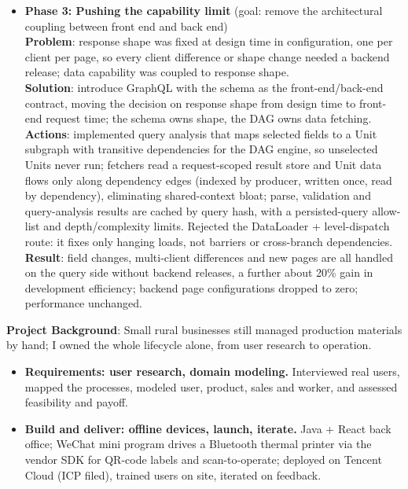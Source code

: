 \documentclass{resume}
\begin{document}
\begin{itemize}
    \textbf{Result}: core interface P99 down 30-40\% on average.
    \item \textbf{Phase 3: Pushing the capability limit} (goal: remove the architectural coupling between front end and back end)\\
    \textbf{Problem}: response shape was fixed at design time in configuration, one per client per page, so every client difference or shape change needed a backend release; data capability was coupled to response shape.\\
    \textbf{Solution}: introduce GraphQL with the schema as the front-end/back-end contract, moving the decision on response shape from design time to front-end request time; the schema owns shape, the DAG owns data fetching.\\
    \textbf{Actions}: implemented query analysis that maps selected fields to a Unit subgraph with transitive dependencies for the DAG engine, so unselected Units never run; fetchers read a request-scoped result store and Unit data flows only along dependency edges (indexed by producer, written once, read by dependency), eliminating shared-context bloat; parse, validation and query-analysis results are cached by query hash, with a persisted-query allow-list and depth/complexity limits. Rejected the DataLoader + level-dispatch route: it fixes only hanging loads, not barriers or cross-branch dependencies.\\
    \textbf{Result}: field changes, multi-client differences and new pages are all handled on the query side without backend releases, a further about 20\% gain in development efficiency; backend page configurations dropped to zero; performance unchanged.
\end{itemize}


\textbf{Project Background}: Small rural businesses still managed production materials by hand; I owned the whole lifecycle alone, from user research to operation.\\

\begin{itemize}
    \item \textbf{Requirements: user research, domain modeling.} Interviewed real users, mapped the processes, modeled user, product, sales and worker, and assessed feasibility and payoff.
    \item \textbf{Build and deliver: offline devices, launch, iterate.} Java + React back office; WeChat mini program drives a Bluetooth thermal printer via the vendor SDK for QR-code labels and scan-to-operate; deployed on Tencent Cloud (ICP filed), trained users on site, iterated on feedback.
\end{itemize}
\end{document}
